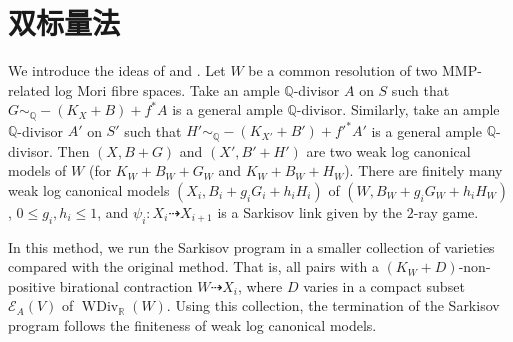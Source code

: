 \chapter{双标量法}

We introduce the ideas of \cite[\S 13]{haconMinimalModelProgram2012} and  \cite{liuSarkisovProgramGeneralized2021}.
Let $W$ be a common resolution of two MMP-related log Mori fibre spaces. Take an ample $\mathbb{Q}$-divisor $A$ on $S$ such that $G \sim_\mathbb{Q} -(K_{X}+B) +f^*A$  is a general ample $\mathbb{Q}$-divisor. Similarly, take an ample $\mathbb{Q}$-divisor $A'$ on $S'$ such that $H' \sim_\mathbb{Q} -(K_{X'}+B') +f'^*A'$  is a general ample $\mathbb{Q}$-divisor. Then  $(X,B+G)$ and $(X',B'+H')$ are two weak log canonical models of $W$ (for $K_{W}+B_{W}+G_{W}$ and $K_{W}+B_{W}+H_{W}$). There are finitely many weak log canonical models $(X_{i},B_{i}+g_{i}G_{i}+h_{i}H_{i})$ of $(W,B_{W}+g_{i}G_{W}+h_{i}H_{W})$, $0\leqslant g_i,h_i\leqslant 1$, and $\psi_{i}:X_{i}\dashrightarrow X_{i+1}$ is a Sarkisov link given by the $2$-ray game.

In this method, we run the Sarkisov program in a smaller collection of varieties compared with the original method. That is, all pairs with a $(K_{W}+D)$-non-positive birational contraction $W\dashrightarrow X_{i}$, where $D$ varies in a compact subset $\mathcal{E}_{A}(V)$ of $\operatorname{WDiv}_{\mathbb{R}}(W)$. Using this collection, the termination of the Sarkisov program follows the finiteness of weak log canonical models.
